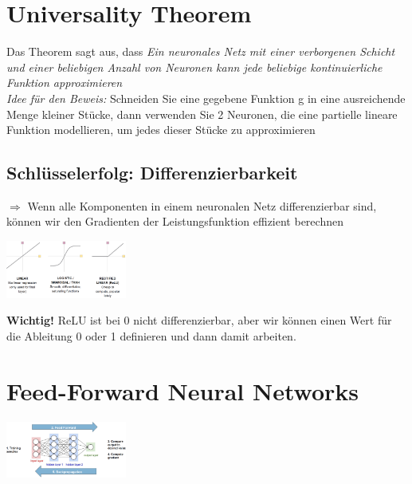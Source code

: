 \documentclass{article}
\newenvironment{Figure}
	{\par\medskip\noindent\minipage{\linewidth}}
	{\endminipage\par\medskip}
\theoremstyle{merke}
\theoremstyle{definition}
\begin{document}
    \section{Universality Theorem}
    Das Theorem sagt aus, dass \textit{Ein neuronales Netz mit einer verborgenen Schicht und einer beliebigen Anzahl von Neuronen kann jede beliebige kontinuierliche Funktion approximieren}\\
    \textit{Idee für den Beweis:} Schneiden Sie eine gegebene Funktion g in eine ausreichende Menge kleiner Stücke, dann verwenden Sie 2 Neuronen, die eine partielle lineare Funktion modellieren, um jedes dieser Stücke zu approximieren\\

        \subsection{Schlüsselerfolg: Differenzierbarkeit}
    $\Rightarrow$ Wenn alle Komponenten in einem neuronalen Netz differenzierbar sind, können wir den Gradienten der Leistungsfunktion effizient berechnen
    \begin{Figure}
    \centering
    \includegraphics[width=150px]{img/activationFunctions.png}
        \label{fig:Abbildung der verschiednen Aktivierungsfunktionen}
    \end{Figure}
    \textbf{Wichtig!} ReLU ist bei 0 nicht differenzierbar, aber wir können einen Wert für die Ableitung 0 oder 1 definieren und dann damit arbeiten.


    \section{Feed-Forward Neural Networks}
    \begin{Figure}
        \centering
        \includegraphics[width=150px]{img/FeedForward.png}
            \label{fig:Abbildung des FeedForward-Prozedere}
    \end{Figure}
\end{document}
